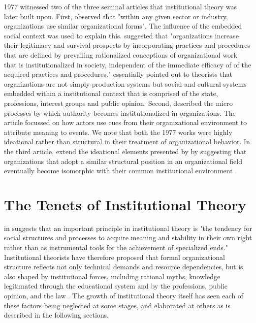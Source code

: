 \documentclass[12pt]{article}
\begin{document}
1977 witnessed two of the three seminal articles that institutional theory was later built upon. First,  \cite{Meyer1977} observed that "within any given sector or industry, organizations use similar organizational forms". The influence of the embedded social context was used to explain this. \cite{Meyer1977} suggested that "organizations increase their legitimacy and survival prospects by incorporating practices and procedures that are defined by prevailing rationalized conceptions of organizational work that is institutionalized in society, independent of the immediate efficacy of of the acquired practices and procedures." \cite{Meyer1977} essentially pointed out to theorists that organizations are not simply production systems but social and cultural systems embedded within a institutional context that is comprised of the state, professions, interest groups and public opinion.  Second, \cite{Zucker1977} described the micro processes by which authority becomes institutionalized in organizations. The article focussed on how actors use cues from their organizational environment to attribute meaning to events. We note that both the 1977 works were highly ideational rather than structural in their treatment of organizational behavior. In the third article, \cite{Dimaggio1983} extend the  ideational elements  presented by \cite{Meyer1977, Zucker1977} by suggesting that organizations that adopt a similar structural position in an organizational field eventually become isomorphic with their common institutional environment \citep{Suddaby2010}.

\section{The Tenets of Institutional Theory}\label{S:Review}
\cite{Lincoln1995} in \cite{Suddaby2010} suggests that an important principle in institutional theory is "the tendency for social structures and processes to acquire meaning and stability in their own right rather than as instrumental tools for the achievement of specialized ends." Institutional theorists have therefore proposed that formal organizational structure reflects not only technical demands and resource dependencies, but is also shaped by institutional forces, including rational myths, knowledge legitimated through the educational system and by the professions, public opinion, and the law \citep{Powell2007}. The growth of institutional theory itself has seen each of these factors being neglected at some stages, and elaborated at others as is described in the following sections.
\end{document}
